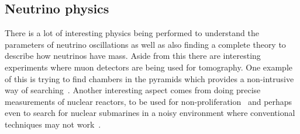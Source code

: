 \subsection{Neutrino physics}

There is a lot of interesting physics being performed to understand the parameters of neutrino oscillations as well as also finding a complete theory to describe how neutrinos have mass. Aside from this there are interesting experiments where muon detectors are being used for tomography. One example of this is trying to find chambers in the pyramids which provides a non-intrusive way of searching~\cite{86Morishima}. Another interesting aspect comes from doing precise measurements of nuclear reactors, to be used for non-proliferation~\cite{87Askins} and perhaps even to search for nuclear submarines in a noisy environment where conventional techniques may not work~\cite{88Jocher}.

\fi
